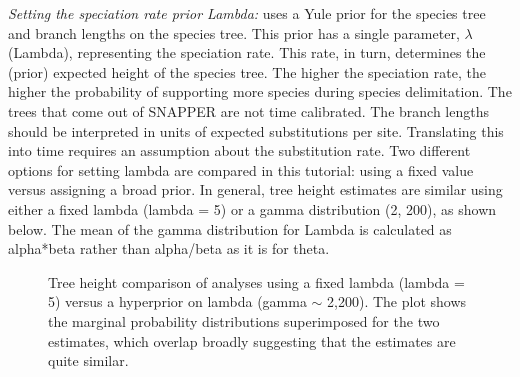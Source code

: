 {\textit{Setting the speciation rate prior Lambda:}  uses a Yule prior for the species tree and branch lengths on the species tree. This prior has a single parameter, {$\lambda$} (Lambda), representing the speciation rate. This rate, in turn, determines the (prior) expected height of the species tree. The higher the speciation rate, the higher the probability of supporting more species during species delimitation. The trees that come out of SNAPPER are not time calibrated. The branch lengths should be interpreted in units of expected substitutions per site. Translating this into time requires an assumption about the substitution rate. Two different options for setting lambda are compared in this tutorial: using a fixed value versus assigning a broad prior. In general, tree height estimates are similar using either a fixed lambda (lambda = 5) or a gamma distribution (2, 200), as shown below. The mean of the gamma distribution for Lambda is calculated as alpha*beta rather than alpha/beta as it is for theta. 

     \begin{figure}[htbp]
        \centering
        \caption{Tree height comparison of analyses using a fixed lambda (lambda = 5) versus a hyperprior on lambda (gamma {$\sim$} 2,200). The plot shows the marginal probability distributions superimposed for the two estimates, which overlap broadly suggesting that the estimates are quite similar.}
        \label{fig:lambda_comparision}
    \end{figure}  
    
}
